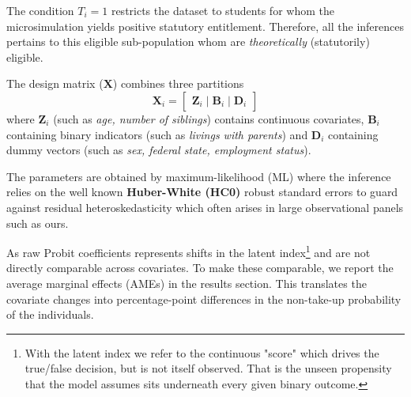 The condition \( T_{i} = 1 \) restricts the dataset to students for whom the microsimulation yields positive statutory entitlement. Therefore, all the inferences pertains to this eligible sub-population whom are \textit{theoretically} (statutorily) eligible. 

The design matrix (\( \mathbf{X} \)) combines three partitions 
\begin{equation}
  \mathbf{X}_{i} = 
  \begin{bmatrix}
    \mathbf{Z}_{i} \mid \mathbf{B}_{i} \mid \mathbf{D}_{i}
  \end{bmatrix}
\end{equation}
where \( \mathbf{Z}_{i} \) (such as \textit{age, number of siblings}) contains continuous covariates, \( \mathbf{B}_{i} \) containing binary indicators (such as \textit{livings with parents})  and \( \mathbf{D}_{i} \) containing dummy vectors (such as \textit{sex, federal state, employment status}). 

The parameters are obtained by maximum-likelihood (ML) where the inference relies on the well known \textbf{Huber-White (HC0)} robust standard errors to guard against residual heteroskedasticity which often arises in large observational panels such as ours.

As raw Probit coefficients represents shifts in the latent index\footnote{
With the latent index we refer to the continuous "score" which drives the true/false decision, but is not itself observed. That is the unseen propensity that the model assumes sits underneath every given binary outcome.
}
and are not directly comparable across covariates. To make these comparable, we report the average marginal effects (AMEs) in the results section. This translates the covariate changes into percentage-point differences in the non-take-up probability of the individuals.



